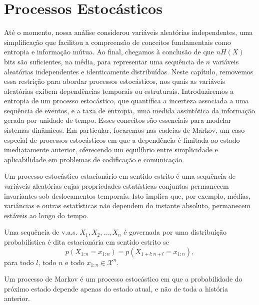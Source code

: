 

\chapter{Processos Estocásticos}

Até o momento, nossa análise considerou variáveis aleatórias independentes, uma
simplificação que facilitou a compreensão de conceitos fundamentais como
entropia e informação mútua. Ao final, chegamos à conclusão de que $nH(X)$ bits são
suficientes, na média, para representar uma sequência de $n$ variáveis aleatórias
independentes e identicamente distribuídas. Neste capítulo, removemos essa restrição para
abordar processos estocásticos, nos quais as variáveis aleatórias exibem
dependências temporais ou estruturais. Introduziremos a entropia de um processo
estocástico, que quantifica a incerteza associada a uma sequência de eventos, e
a taxa de entropia, uma medida assintótica da informação gerada por unidade de
tempo. Esses conceitos são essenciais para modelar sistemas dinâmicos. Em
particular, focaremos nas cadeias de Markov, um caso especial de processos
estocásticos em que a dependência é limitada ao estado imediatamente anterior,
oferecendo um equilíbrio entre simplicidade e aplicabilidade em problemas de
codificação e comunicação.

Um processo estocástico estacionário em sentido estrito é uma sequência de
variáveis aleatórias cujas propriedades estatísticas conjuntas permanecem
invariantes sob deslocamentos temporais. Isto implica que, por exemplo, médias,
variâncias e outras estatísticas não dependem do instante absoluto, permanecem
estáveis ao longo do tempo.

\begin{definition}
  Uma sequência de v.a.s. $X_1, X_2, \ldots, X_n$ é governada por uma distribuição probabilística é dita
  estacionária em sentido estrito se
  \begin{equation}
  p(X_{1:n} = x_{1:n}) = p(X_{1+l:n+l} = x_{1:n}) ,
  \end{equation}
  para todo $l$, todo $n$ e todo $x_{1:n} \in \mathcal{X}^n$.
\end{definition}

Um processo de Markov é um processo estocástico em que a probabilidade do
próximo estado depende apenas do estado atual, e não de toda a história
anterior.

